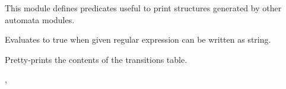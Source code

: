 This module defines predicates useful to print structures generated by
other automata modules.\vspace{0.7cm}

\begin{description}
Evaluates to true when given regular expression  can be written
as  string.

\begin{tags}
\end{tags}

Pretty-prints the contents of the transitions table.

\begin{tags}
, 
\end{tags}
\end{description}

